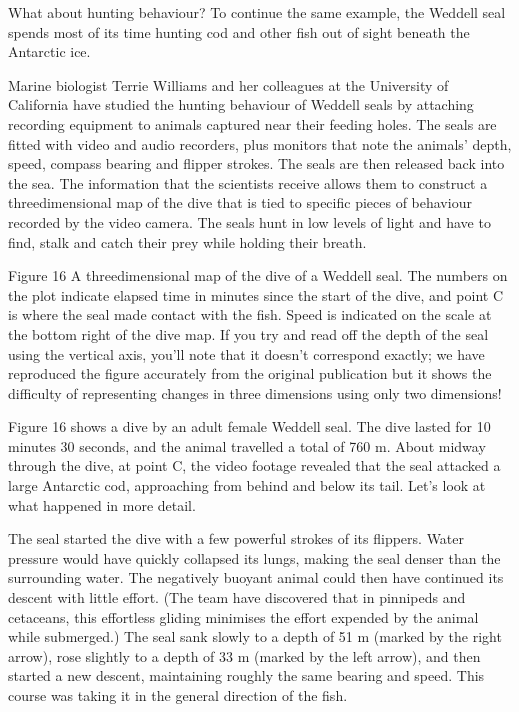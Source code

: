 \documentclass[letterpaper,10pt,english]{sphinxmanual}
\let\sphinxpxdimen\pdfpxdimen\else\newdimen\sphinxpxdimen
\begin{document}
What about hunting behaviour? To continue the same example, the Weddell seal spends most of its time hunting cod and other fish out of sight beneath the Antarctic ice.

Marine biologist Terrie Williams and her colleagues at the University of California have studied the hunting behaviour of Weddell seals by attaching recording equipment to animals captured near their feeding holes. The seals are fitted with video and audio recorders, plus monitors that note the animals’ depth, speed, compass bearing and flipper strokes. The seals are then released back into the sea. The information that the scientists receive allows them to construct a three\sphinxhyphen{}dimensional map of
the dive that is tied to specific pieces of behaviour recorded by the video camera. The seals hunt in low levels of light and have to find, stalk and catch their prey while holding their breath.

\sphinxincludegraphics[width=621\sphinxpxdimen,height=424\sphinxpxdimen]{{s182_11_figure_14}.jpg}

Figure 16 A three\sphinxhyphen{}dimensional map of the dive of a Weddell seal. The numbers on the plot indicate elapsed time in minutes since the start of the dive, and point C is where the seal made contact with the fish. Speed is indicated on the scale at the bottom right of the dive map. If you try and read off the depth of the seal using the vertical axis, you’ll note that it doesn’t correspond exactly; we have reproduced the figure accurately from the original publication but it shows the difficulty of
representing changes in three dimensions using only two dimensions!

Figure 16 shows a dive by an adult female Weddell seal. The dive lasted for 10 minutes 30 seconds, and the animal travelled a total of 760 m. About midway through the dive, at point C, the video footage revealed that the seal attacked a large Antarctic cod, approaching from behind and below its tail. Let’s look at what happened in more detail.

The seal started the dive with a few powerful strokes of its flippers. Water pressure would have quickly collapsed its lungs, making the seal denser than the surrounding water. The negatively buoyant animal could then have continued its descent with little effort. (The team have discovered that in pinnipeds and cetaceans, this effortless gliding minimises the effort expended by the animal while submerged.) The seal sank slowly to a depth of 51 m (marked by the right arrow), rose slightly to a
depth of 33 m (marked by the left arrow), and then started a new descent, maintaining roughly the same bearing and speed. This course was taking it in the general direction of the fish.
\end{document}
